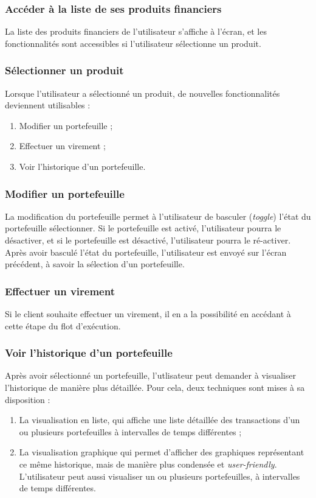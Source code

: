 \documentclass{article}
\begin{document}
\subsubsection{Accéder à la liste de ses produits financiers}
La liste des produits financiers de l'utilisateur s'affiche à l'écran, et les fonctionnalités sont accessibles si l'utilisateur sélectionne un produit.


\subsubsection{Sélectionner un produit}
Lorsque l'utilisateur a sélectionné un produit, de nouvelles fonctionnalités deviennent utilisables :
\begin{enumerate}
\item Modifier un portefeuille ;
\item Effectuer un virement ;
\item Voir l'historique d'un portefeuille.
\end{enumerate}


\subsubsection{Modifier un portefeuille}
La modification du portefeuille permet à l'utilisateur de basculer (\emph{toggle}) l'état du portefeuille sélectionner. Si le portefeuille est activé, l'utilisateur pourra le désactiver, et si le portefeuille est désactivé, l'utilisateur pourra le ré-activer. Après avoir basculé l'état du portefeuille, l'utilisateur est envoyé sur l'écran précédent, à savoir la sélection d'un portefeuille.


\subsubsection{Effectuer un virement}
Si le client souhaite effectuer un virement, il en a la possibilité en accédant à cette étape du flot d'exécution.


\subsubsection{Voir l'historique d'un portefeuille}
Après avoir sélectionné un portefeuille, l'utlisateur peut demander à visualiser l'historique de manière plus détaillée. Pour cela, deux techniques sont mises à sa disposition :
\begin{enumerate}
\item La visualisation en liste, qui affiche une liste détaillée des transactions d'un ou plusieurs portefeuilles à intervalles de temps différentes ;
\item La visualisation graphique qui permet d'afficher des graphiques représentant ce même historique, mais de manière plus condensée et \emph{user-friendly}. L'utilisateur peut aussi visualiser un ou plusieurs portefeuilles, à intervalles de temps différentes.
\end{enumerate}
\end{document}

